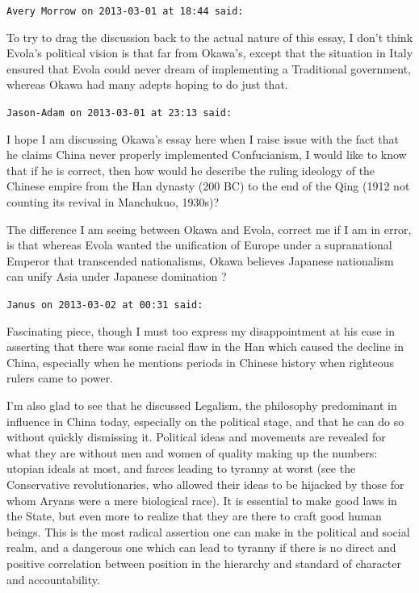 \begin{footnotesize}
\begin{sffamily}
\hfill

\texttt{Avery Morrow on 2013-03-01 at 18:44 said: }

To try to drag the discussion back to the actual nature of this essay, I don't think Evola's political vision is that far from Okawa's, except that the situation in Italy ensured that Evola could never dream of implementing a Traditional government, whereas Okawa had many adepts hoping to do just that.


\hfill

\texttt{Jason-Adam on 2013-03-01 at 23:13 said: }

I hope I am discussing Okawa's essay here when I raise issue with the fact that he claims China never properly implemented Confucianism, I would like to know that if he is correct, then how would he describe the ruling ideology of the Chinese empire from the Han dynasty (200 BC) to the end of the Qing (1912 not counting its revival in Manchukuo, 1930s)?

The difference I am seeing between Okawa and Evola, correct me if I am in error, is that whereas Evola wanted the unification of Europe under a supranational Emperor that transcended nationalisms, Okawa believes Japanese nationalism can unify Asia under Japanese domination ?


\hfill

\texttt{Janus on 2013-03-02 at 00:31 said: }

Fascinating piece, though I must too express my disappointment at his ease in asserting that there was some racial flaw in the Han which caused the decline in China, especially when he mentions periods in Chinese history when righteous rulers came to power. 

I'm also glad to see that he discussed Legalism, the philosophy predominant in influence in China today, especially on the political stage, and that he can do so without quickly dismissing it. Political ideas and movements are revealed for what they are without men and women of quality making up the numbers: utopian ideals at most, and farces leading to tyranny at worst (see the Conservative revolutionaries, who allowed their ideas to be hijacked by those for whom Aryans were a mere biological race). It is essential to make good laws in the State, but even more to realize that they are there to craft good human beings. This is the most radical assertion one can make in the political and social realm, and a dangerous one which can lead to tyranny if there is no direct and positive correlation between position in the hierarchy and standard of character and accountability. 


\end{sffamily}
\end{footnotesize}
